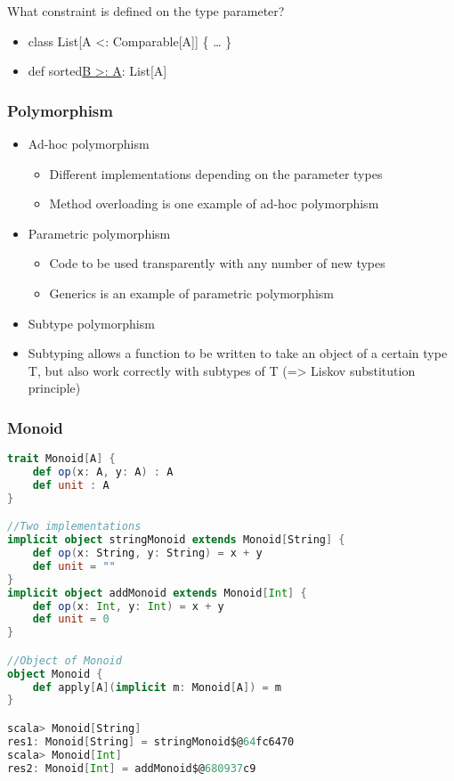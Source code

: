 What constraint is defined on the type parameter?

\begin{itemize}
\tightlist
\item
  class List{[}A \textless{}: Comparable{[}A{]}{]} \{ \ldots{} \}
\item
  def sorted\href{implicit\%20ord:\%20math.Ordering\%5BB\%5D}{B
  \textgreater{}: A}: List{[}A{]}
\end{itemize}

\hypertarget{polymorphism}{%
\subsubsection{Polymorphism}\label{polymorphism}}

\begin{itemize}
\tightlist
\item
  Ad-hoc polymorphism

  \begin{itemize}
  \tightlist
  \item
    Different implementations depending on the parameter types
  \item
    Method overloading is one example of ad-hoc polymorphism
  \end{itemize}
\item
  Parametric polymorphism

  \begin{itemize}
  \tightlist
  \item
    Code to be used transparently with any number of new types
  \item
    Generics is an example of parametric polymorphism
  \end{itemize}
\item
  Subtype polymorphism
\item
  Subtyping allows a function to be written to take an object of a
  certain type T, but also work correctly with subtypes of T
  (=\textgreater{} Liskov substitution principle)
\end{itemize}

\hypertarget{monoid}{%
\subsubsection{Monoid}\label{monoid}}

\begin{lstlisting}[language=scala,mathescape=false]
trait Monoid[A] {
    def op(x: A, y: A) : A
    def unit : A
}

//Two implementations
implicit object stringMonoid extends Monoid[String] {
    def op(x: String, y: String) = x + y
    def unit = ""
}
implicit object addMonoid extends Monoid[Int] {
    def op(x: Int, y: Int) = x + y
    def unit = 0
}

//Object of Monoid
object Monoid {
    def apply[A](implicit m: Monoid[A]) = m
}

scala> Monoid[String]
res1: Monoid[String] = stringMonoid$@64fc6470
scala> Monoid[Int]
res2: Monoid[Int] = addMonoid$@680937c9
\end{lstlisting}

